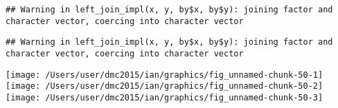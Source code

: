 \documentclass[10pt]{report}
\newenvironment{Shaded}{}{}
\newcommand{\KeywordTok}[1]{\textcolor[rgb]{0.00,0.44,0.13}{\textbf{{#1}}}}
\newcommand{\DataTypeTok}[1]{\textcolor[rgb]{0.56,0.13,0.00}{{#1}}}
\newcommand{\StringTok}[1]{\textcolor[rgb]{0.25,0.44,0.63}{{#1}}}
\newcommand{\NormalTok}[1]{{#1}}
\begin{document}
\begin{verbatim}
## Warning in left_join_impl(x, y, by$x, by$y): joining factor and character vector, coercing into character vector
\end{verbatim}

\begin{Shaded}
\end{Shaded}

\begin{verbatim}
## Warning in left_join_impl(x, y, by$x, by$y): joining factor and character vector, coercing into character vector
\end{verbatim}

\begin{Shaded}
\end{Shaded}

\begin{center}\texttt{[image: /Users/user/dmc2015/ian/graphics/fig\_unnamed-chunk-50-1]} \texttt{[image: /Users/user/dmc2015/ian/graphics/fig\_unnamed-chunk-50-2]} \texttt{[image: /Users/user/dmc2015/ian/graphics/fig\_unnamed-chunk-50-3]} \end{center}
\end{document}
